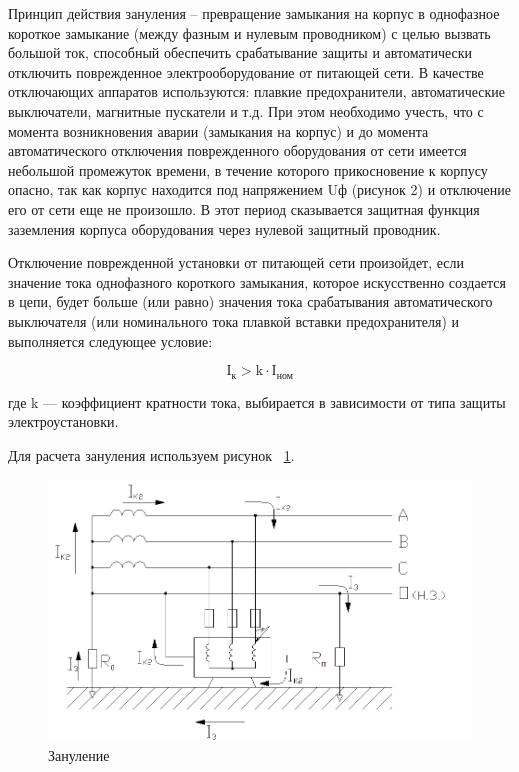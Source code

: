 Принцип действия зануления – превращение замыкания на корпус в однофазное короткое замыкание (между фазным и нулевым проводником) с целью вызвать большой ток, способный обеспечить срабатывание защиты и автоматически отключить поврежденное электрооборудование от питающей сети. В качестве отключающих аппаратов используются: плавкие предохранители, автоматические выключатели, магнитные пускатели и т.д. При этом необходимо учесть, что с момента возникновения аварии (замыкания на корпус) и до момента автоматического отключения поврежденного оборудования от сети имеется небольшой промежуток времени, в течение которого прикосновение к корпусу опасно, так как корпус находится под напряжением Uф  (рисунок 2)  и отключение его от сети еще не произошло. В этот период сказывается защитная функция заземления корпуса оборудования через нулевой защитный проводник.

Отключение поврежденной установки от питающей сети произойдет, если значение тока однофазного короткого замыкания, которое искусственно создается в цепи, будет больше (или равно) значения тока срабатывания автоматического выключателя (или номинального тока плавкой вставки предохранителя) и выполняется следующее условие:

\begin{equation}
  \label{eq:econ:total_program_size_corrected}
  \text{I}_{\text{к}} > \text{k}\cdot \text{I}_{\text{ном}}
\end{equation}

где k --- коэффициент кратности тока, выбирается в зависимости от типа защиты электроустановки.

Для расчета зануления используем рисунок ~\ref{fig:ot-zanul2}.

\begin{figure}
  	\centering
  	\includegraphics[width=1\textwidth]{images/ot-zanul2.png}
  	\caption{Зануление}
    \label{fig:ot-zanul2}
\end{figure}

